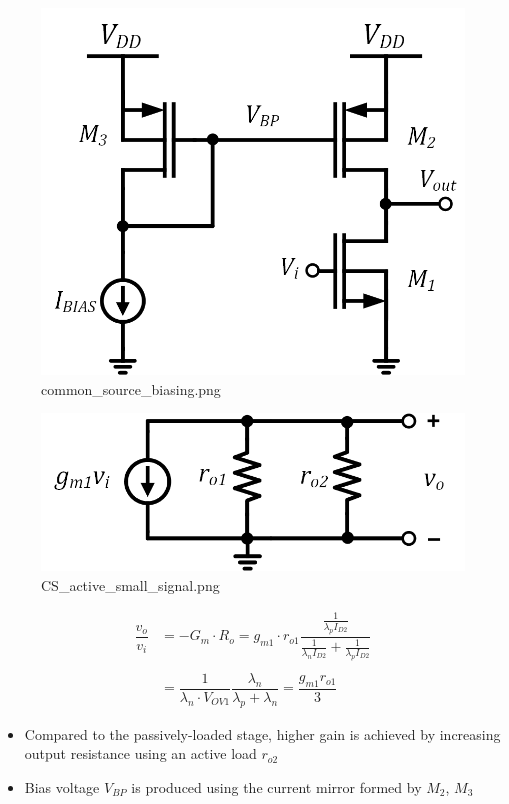 \documentclass[11pt]{article}
\providecommand{\tightlist}{%
      \setlength{\itemsep}{0pt}\setlength{\parskip}{0pt}}
\begin{document}
    \begin{figure}
\centering
\includegraphics{common_source_biasing.png}
\caption{common\_source\_biasing.png}
\end{figure}

    \begin{figure}
\centering
\includegraphics{CS_active_small_signal.png}
\caption{CS\_active\_small\_signal.png}
\end{figure}

\begin{align}
\dfrac{v_o}{v_i} &= -G_m\cdot R_o = g_{m1}\cdot r_{o1} \dfrac{\frac{1}{\lambda_p I_{D2}}}{\frac{1}{\lambda_n I_{D2}} + \frac{1}{\lambda_p I_{D2}}}\\
\\
&= \dfrac{1}{\lambda_n \cdot V_{OV1}}\dfrac{\lambda_n}{\lambda_p + \lambda_n} = \boxed{ \dfrac{g_{m1}r_{o1}}{3} }
\end{align}

    \begin{itemize}
\tightlist
\item
  Compared to the passively-loaded stage, higher gain is achieved by
  increasing output resistance using an active load \(r_{o2}\)
\item
  Bias voltage \(V_{BP}\) is produced using the current mirror formed by
  \(M_2\), \(M_3\)
\end{itemize}
\end{document}
